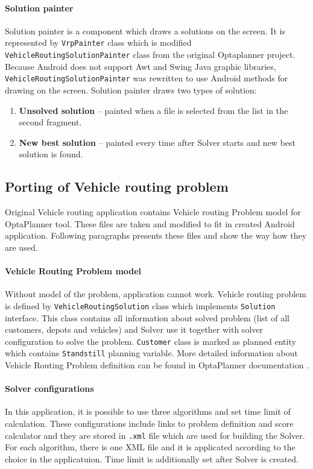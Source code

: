 \paragraph{Solution painter}
Solution painter is a component which draws a solutions on the screen. It is represented by \texttt{VrpPainter} class
which is modified \texttt{VehicleRoutingSolutionPainter} class from the original Optaplanner project. Because
Android does not support Awt and Swing Java graphic libraries, \texttt{VehicleRoutingSolutionPainter} was rewritten to
use Android methods for drawing on the screen. Solution painter draws two types of solution:

\begin{enumerate}
  \item \textbf{Unsolved solution} --  painted when a file is selected from the list in the second fragment.
  \item \textbf{New best solution} -- painted every time after Solver starts and new best solution is found.
\end{enumerate}

\subsection{Porting of Vehicle routing problem}
Original Vehicle routing application contains Vehicle routing Problem model for OptaPlanner tool. These files are taken
and modified to fit in created Android application. Following paragraphs presents these files and show the way how they
are used.

\paragraph{Vehicle Routing Problem model}
Without model of the problem, application cannot work. Vehicle routing problem is defined by
\texttt{VehicleRoutingSolution} class which implements \texttt{Solution} interface. This class contains all information
about solved problem (list of all customers, depots and vehicles) and Solver use it together with solver configuration
to solve the problem. \texttt{Customer} class is marked as planned entity which contains \texttt{Standstill} planning
variable. More detailed information about Vehicle Routing Problem definition can be found in OptaPlanner documentation
\cite{OptaPlannerDoc}.

\paragraph{Solver configurations}
In this application, it is possible to use three algorithms and set time limit of calculation. These configurations
include links to problem definition and score calculator and they are stored in \texttt{.xml} file which are used
for building the Solver. For each algorithm, there is one XML file and it is applicated according to the choice in the
applicatuion. Time limit is additionally set after Solver is created.


